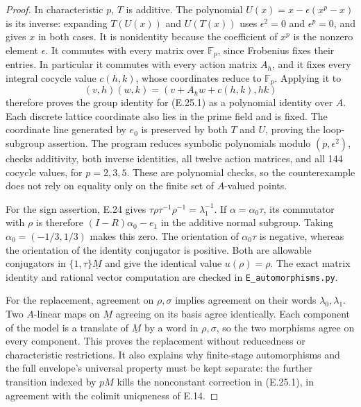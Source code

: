 \begin{proof}
In characteristic \(p\), \(T\) is additive.  The polynomial
\(U(x)=x-\epsilon(x^p-x)\) is its inverse: expanding
\(T(U(x))\) and \(U(T(x))\) uses \(\epsilon^2=0\) and
\(\epsilon^p=0\), and gives \(x\) in both cases.  It is
nonidentity because the coefficient of \(x^p\) is the
nonzero element \(\epsilon\).  It commutes with every
matrix over \(\mathbb F_p\), since Frobenius fixes their
entries.  In particular it commutes with every action
matrix \(A_h\), and it fixes every integral cocycle value
\(c(h,k)\), whose coordinates reduce to \(\mathbb F_p\).
Applying it to
\[
 (v,h)(w,k)=(v+A_hw+c(h,k),hk)
\]
therefore proves the group identity for (E.25.1) as a
polynomial identity over \(A\).  Each discrete lattice
coordinate also lies in the prime field and is fixed.
The coordinate line generated by \(e_0\) is preserved by
both \(T\) and \(U\), proving the loop-subgroup assertion.
The program reduces symbolic polynomials modulo
\((p,\epsilon^2)\), checks additivity, both inverse identities,
all twelve action matrices, and all 144 cocycle values,
for \(p=2,3,5\).  These are polynomial checks, so the
counterexample does not rely on equality only on the
finite set of \(A\)-valued points.

For the sign assertion, E.24 gives
\(\tau\rho\tau^{-1}\rho^{-1}=\lambda_1^{-1}\).
If \(\alpha=\alpha_0\tau\), its commutator with \(\rho\)
is therefore \((I-R)\alpha_0-e_1\) in the additive normal
subgroup.  Taking \(\alpha_0=(-1/3,1/3)\) makes this zero.
The orientation of \(\alpha_0\tau\) is negative, whereas
the orientation of the identity conjugator is positive.
Both are allowable conjugators in \(\{1,\tau\}\underline M\)
and give the identical value \(u(\rho)=\rho\).
The exact matrix identity and rational vector computation
are checked in \texttt{E\_automorphisms.py}.

For the replacement, agreement on \(\rho,\sigma\) implies
agreement on their words \(\lambda_0,\lambda_1\).
Two \(A\)-linear maps on \(\underline M\) agreeing on its
basis agree identically.  Each component of the model is
a translate of \(\underline M\) by a word in \(\rho,\sigma\),
so the two morphisms agree on every component.  This proves
the replacement without reducedness or characteristic
restrictions.  It also explains why finite-stage
automorphisms and the full envelope's universal property
must be kept separate: the further transition indexed by
\(pM\) kills the nonconstant correction in (E.25.1), in
agreement with the colimit uniqueness of E.14.
\end{proof}
